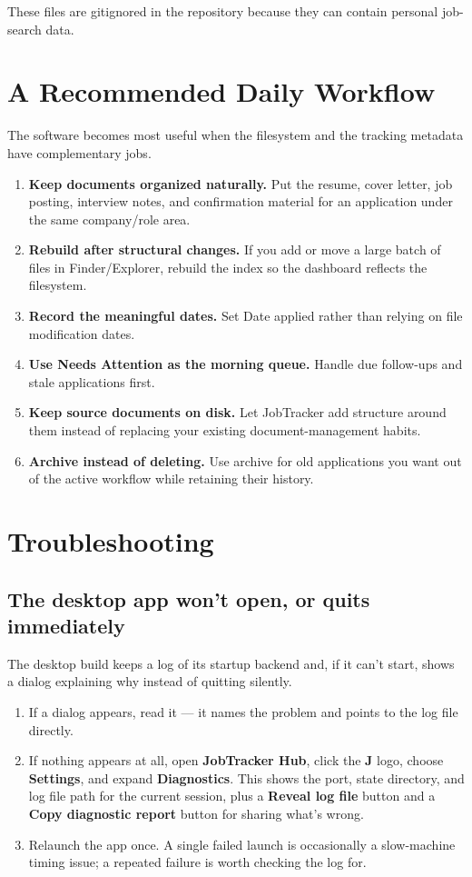 \documentclass[11pt]{article}
\newcommand{\app}[1]{\textbf{#1}}
\begin{document}
These files are gitignored in the repository because they can contain personal job-search data.

\section{A Recommended Daily Workflow}\label{sec:daily}

The software becomes most useful when the filesystem and the tracking metadata have complementary jobs.

\begin{enumerate}
  \item \textbf{Keep documents organized naturally.} Put the resume, cover letter, job posting, interview notes, and confirmation material for an application under the same company/role area.
  \item \textbf{Rebuild after structural changes.} If you add or move a large batch of files in Finder/Explorer, rebuild the index so the dashboard reflects the filesystem.
  \item \textbf{Record the meaningful dates.} Set Date applied rather than relying on file modification dates.
  \item \textbf{Use Needs Attention as the morning queue.} Handle due follow-ups and stale applications first.
  \item \textbf{Keep source documents on disk.} Let JobTracker add structure around them instead of replacing your existing document-management habits.
  \item \textbf{Archive instead of deleting.} Use archive for old applications you want out of the active workflow while retaining their history.
\end{enumerate}

\section{Troubleshooting}
\label{sec:troubleshooting}

\subsection{The desktop app won't open, or quits immediately}

The desktop build keeps a log of its startup backend and, if it can't start, shows a dialog explaining why instead of quitting silently.

\begin{enumerate}
  \item If a dialog appears, read it — it names the problem and points to the log file directly.
  \item If nothing appears at all, open \app{JobTracker Hub}, click the \app{J} logo, choose \app{Settings}, and expand \app{Diagnostics}. This shows the port, state directory, and log file path for the current session, plus a \app{Reveal log file} button and a \app{Copy diagnostic report} button for sharing what's wrong.
  \item Relaunch the app once. A single failed launch is occasionally a slow-machine timing issue; a repeated failure is worth checking the log for.
\end{enumerate}
\end{document}
